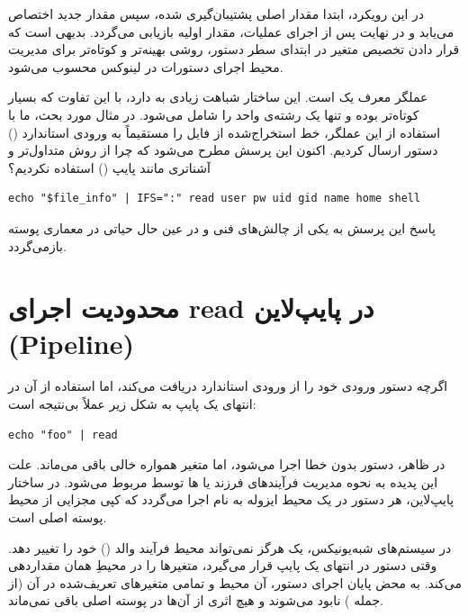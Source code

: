 در این رویکرد، ابتدا مقدار اصلی  پشتیبان‌گیری شده، سپس مقدار جدید اختصاص می‌یابد و در نهایت پس از اجرای عملیات، مقدار اولیه بازیابی می‌گردد. بدیهی است که قرار دادن تخصیص متغیر در ابتدای سطر دستور، روشی بهینه‌تر و کوتاه‌تر برای مدیریت محیط اجرای دستورات در لینوکس محسوب می‌شود.

عملگر \cmd{<<<} معرف یک  است. این ساختار شباهت زیادی به  دارد، با این تفاوت که بسیار کوتاه‌تر بوده و تنها یک رشته‌ی واحد را شامل می‌شود. در مثال مورد بحث، ما با استفاده از این عملگر، خط استخراج‌شده از فایل  را مستقیماً به ورودی استاندارد () دستور  ارسال کردیم. اکنون این پرسش مطرح می‌شود که چرا از روش متداول‌تر و آشناتری مانند پایپ () استفاده نکردیم؟

\begin{latin}
\begin{lstlisting}
echo "$file_info" | IFS=":" read user pw uid gid name home shell
\end{lstlisting}
\end{latin}

پاسخ این پرسش به یکی از چالش‌های فنی و در عین حال حیاتی در معماری پوسته بازمی‌گردد.

\section{محدودیت اجرای read در پایپ‌لاین (Pipeline)}

اگرچه دستور  ورودی خود را از ورودی استاندارد دریافت می‌کند، اما استفاده از آن در انتهای یک پایپ به شکل زیر عملاً بی‌نتیجه است:

\begin{latin}
\begin{lstlisting}
echo "foo" | read
\end{lstlisting}
\end{latin}

در ظاهر، دستور بدون خطا اجرا می‌شود، اما متغیر  همواره خالی باقی می‌ماند. علت این پدیده به نحوه مدیریت فرآیندهای فرزند یا ها توسط  مربوط می‌شود. در ساختار پایپ‌لاین، هر دستور در یک محیط ایزوله به نام  اجرا می‌گردد که کپی مجزایی از محیط پوسته اصلی است.

در سیستم‌های شبه‌یونیکس، یک  هرگز نمی‌تواند محیط فرآیند والد () خود را تغییر دهد. وقتی دستور  در انتهای یک پایپ قرار می‌گیرد، متغیرها را در محیطِ همان  مقداردهی می‌کند. به محض پایان اجرای دستور، آن محیط و تمامی متغیرهای تعریف‌شده در آن (از جمله ) نابود می‌شوند و هیچ اثری از آن‌ها در پوسته اصلی باقی نمی‌ماند.

